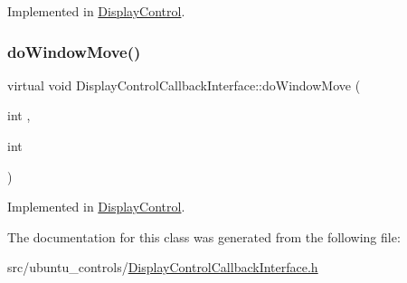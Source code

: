 Implemented in \hyperlink{classDisplayControl_ad5fa763a77c680ce7b2089c6d79c4eb7}{Display\+Control}.

\mbox{\label{classDisplayControlCallbackInterface_af8f01d480c76ee88d2719a246b5d4135}} 
\subsubsection{\texorpdfstring{do\+Window\+Move()}{doWindowMove()}}
{\footnotesize\ttfamily virtual void Display\+Control\+Callback\+Interface\+::do\+Window\+Move (\begin{DoxyParamCaption}\item[{int}]{,  }\item[{int}]{ }\end{DoxyParamCaption})\hspace{0.3cm}{\ttfamily [pure virtual]}}



Implemented in \hyperlink{classDisplayControl_aca4208c53cac28e164e7949effdc04cd}{Display\+Control}.



The documentation for this class was generated from the following file\+:\begin{DoxyCompactItemize}
\item 
src/ubuntu\+\_\+controls/\hyperlink{DisplayControlCallbackInterface_8h}{Display\+Control\+Callback\+Interface.\+h}\end{DoxyCompactItemize}
